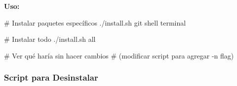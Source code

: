 \documentclass[
  doc,
  floatsintext,
  longtable,
  a4paper,
  nolmodern,
  notxfonts,
  notimes,
  12pt,
  colorlinks=true,linkcolor=blue,citecolor=blue,urlcolor=blue]{apa7}
\newenvironment{Shaded}{\begin{snugshade}}{\end{snugshade}}
\newcommand{\BuiltInTok}[1]{\textcolor[rgb]{0.00,0.23,0.31}{#1}}
\newcommand{\CommentTok}[1]{\textcolor[rgb]{0.37,0.37,0.37}{#1}}
\newcommand{\ControlFlowTok}[1]{\textcolor[rgb]{0.00,0.23,0.31}{\textbf{#1}}}
\newcommand{\ExtensionTok}[1]{\textcolor[rgb]{0.00,0.23,0.31}{#1}}
\newcommand{\FunctionTok}[1]{\textcolor[rgb]{0.28,0.35,0.67}{#1}}
\newcommand{\KeywordTok}[1]{\textcolor[rgb]{0.00,0.23,0.31}{\textbf{#1}}}
\newcommand{\NormalTok}[1]{\textcolor[rgb]{0.00,0.23,0.31}{#1}}
\newcommand{\OperatorTok}[1]{\textcolor[rgb]{0.37,0.37,0.37}{#1}}
\newcommand{\OtherTok}[1]{\textcolor[rgb]{0.00,0.23,0.31}{#1}}
\newcommand{\StringTok}[1]{\textcolor[rgb]{0.13,0.47,0.30}{#1}}
\newcommand{\VariableTok}[1]{\textcolor[rgb]{0.07,0.07,0.07}{#1}}
\begin{document}
\begin{Shaded}
\end{Shaded}

\textbf{Uso:}

\begin{Shaded}
\begin{Highlighting}[]
\CommentTok{\# Instalar paquetes específicos}
\ExtensionTok{./install.sh}\NormalTok{ git shell terminal}

\CommentTok{\# Instalar todo}
\ExtensionTok{./install.sh}\NormalTok{ all}

\CommentTok{\# Ver qué haría sin hacer cambios}
\CommentTok{\# (modificar script para agregar {-}n flag)}
\end{Highlighting}
\end{Shaded}

\subsubsection{Script para Desinstalar}\label{script-para-desinstalar}
\end{document}
